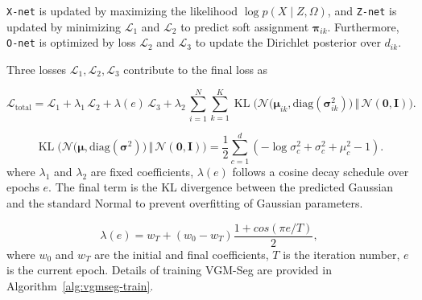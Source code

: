 \documentclass[preprint,12pt]{elsarticle}
\begin{document}
\texttt{X-net} is updated by maximizing the likelihood $\log p(X\mid Z,\Omega)$, and \texttt{Z-net} is updated by minimizing $\mathcal{L}_1$ and $\mathcal{L}_2$ to predict soft assignment $\boldsymbol{\pi}_{ik}$.
Furthermore, \texttt{O-net} is optimized by loss $\mathcal{L}_2$ and $\mathcal{L}_3$ to update the Dirichlet posterior over $d_{ik}$.



Three losses $\mathcal{L}_1, \mathcal{L}_2, \mathcal{L}_3$ contribute to the final loss as

\begin{equation}
\label{loss_total}
\mathcal{L}_{\text{total}}
= \mathcal{L}_1 + \lambda_1\,\mathcal{L}_2 + \lambda(e)\,\mathcal{L}_3
+ \lambda_2\,\sum_{i=1}^N\sum_{k=1}^K
\operatorname{KL}\Big(\mathcal{N}\big(\boldsymbol{\mu}_{ik}, \mathrm{diag}(\boldsymbol{\sigma}^2_{ik})\big)\,\Vert\,\mathcal{N}(\mathbf{0}, \mathbf{I})\Big).
\end{equation}

\begin{equation}
\operatorname{KL}\Big(\mathcal{N}\big(\boldsymbol{\mu}, \mathrm{diag}(\boldsymbol{\sigma}^2)\big)\,\Vert\,\mathcal{N}(\mathbf{0}, \mathbf{I})\Big)
= \frac{1}{2}\sum_{c=1}^{d}\left(-\log \sigma^2_{c} + \sigma^2_{c} + \mu^2_{c} - 1\right).
\end{equation}
where $\lambda_1$ and $\lambda_2$ are fixed coefficients, $\lambda(e)$ follows a cosine decay schedule over epochs $e$. The final term is the KL divergence between the predicted Gaussian and the standard Normal to prevent overfitting of Gaussian parameters.

\begin{equation}
    \lambda(e) = w_T+(w_0-w_T)\frac{1+cos(\pi e/T)}{2},
\end{equation}
where $w_0$ and $w_T$ are the initial and final coefficients, $T$ is the iteration number, $e$ is the current epoch.
Details of training VGM-Seg are provided in Algorithm~\ref{alg:vgmseg-train}.




\end{document}
